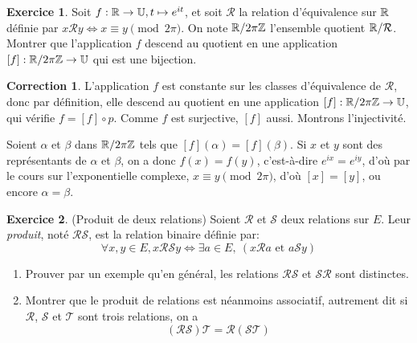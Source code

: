 \documentclass[11pt,a4paper]{article}
\theoremstyle{definition}
\newtheorem{exo}{Exercice}
\newtheorem{cor}{Correction}
\newcommand{\exercice}[1]{} \newcommand{\finexercice}{}
\newcommand{\enonce}{\begin{exo}} \newcommand{\finenonce}{\end{exo}}
\newcommand{\correction}{\begin{cor}} \newcommand{\fincorrection}{\end{cor}}
\newcommand{\noindication}{\stepcounter{ind}}
\newcommand{\nocorrection}{\stepcounter{cor}}
\begin{document}
\noindication

\nocorrection

\finexercice
\exercice{7197, megy, 2019/07/23}

\enonce
Soit $f : \mathbb{R}\to \mathbb U, t\mapsto e^{it}$, et soit $\mathcal R$ la relation d'équivalence sur $\mathbb{R}$ définie par $x\mathcal R y \iff x\equiv y \pmod{2\pi}$. On note $\mathbb{R}/2\pi\mathbb{Z}$ l'ensemble quotient $\mathbb{R}/\mathcal R$. Montrer que l'application $f$ descend au quotient en une application $[f] :\mathbb{R}/2\pi\mathbb{Z} \to \mathbb U$ qui est une bijection.

\finenonce

\noindication

\correction

L'application $f$ est constante sur les classes d'équivalence de $\mathcal R$, donc par définition, elle descend au quotient en une application $[f] : \mathbb{R}/2\pi\mathbb{Z} \to \mathbb U$, qui vérifie  $f= [f]\circ p$. Comme $f$ est surjective, $[f]$ aussi. Montrons l'injectivité.

Soient $\alpha$ et $\beta$ dans $\mathbb{R}/2\pi\mathbb{Z}$ tels que $[f](\alpha) = [f](\beta)$. Si $x$ et $y$ sont des représentants de $\alpha$ et $\beta$, on a donc $f(x)=f(y)$, c'est-à-dire $e^{ix}=e^{iy}$, d'où par le cours sur l'exponentielle complexe, $x\equiv y \pmod{2\pi}$, d'où $[x]=[y]$, ou encore $\alpha=\beta$.

\fincorrection

\finexercice
\exercice{7198, megy, 2019/07/23}

\enonce
(Produit de deux relations) 
Soient $\mathcal R$ et $\mathcal S$ deux relations sur $E$. Leur \emph{produit}, noté $\mathcal R \mathcal S$, est la relation binaire définie par:
\[ \forall x,y\in E, x \mathcal R \mathcal S y 
\iff \exists a\in E, \: (x \mathcal R a \text{ et } a \mathcal S y)
\]
\begin{enumerate}
\item Prouver par un exemple qu'en général, les relations $\mathcal R \mathcal S$ et $\mathcal S \mathcal R$ sont distinctes.
\item Montrer que le produit de relations est néanmoins associatif, autrement dit si $\mathcal R$, $\mathcal S$ et $\mathcal T$ sont trois relations, on a 
\[ (\mathcal R \mathcal S) \mathcal T = \mathcal R (\mathcal S \mathcal T)\]
\end{enumerate}
\finenonce

\noindication

\nocorrection

\finexercice
\exercice{7199, megy, 2019/07/23}
\end{document}

